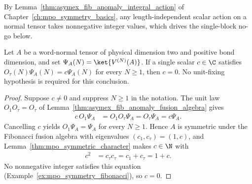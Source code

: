 By Lemma~\ref{thm:asymex_fib_anomaly_integral_action} of
Chapter~\ref{ch:mpo_symmetry_basics}, any length-independent scalar action on a
normal tensor takes nonnegative integer values, which drives the single-block
no-go below.

\begin{lemma}%
    \label{thm:asymex_fib_anomaly_eigenvalue_zero}
    \leanok
    Let $A$ be a word-normal tensor of physical dimension two and
    positive bond dimension, and set
    $\Psi_A(N)=\ket{V^{(N)}(A)}$. If a single scalar $c\in\C$ satisfies
    $O_\tau(N)\Psi_A(N)=c\Psi_A(N)$ for every $N\geq1$, then $c=0$.
    No unit-fixing hypothesis is required for this conclusion.
\end{lemma}

\begin{proof}
    \leanok
    Suppose $c\neq0$ and suppress $N\geq1$ in the notation. The unit law
    $O_1O_\tau=O_\tau$ of
    Lemma~\ref{thm:asymex_fib_anomaly_fusion_algebra} gives
    \begin{align}
        c\,O_1\Psi_A
         & =O_1O_\tau\Psi_A=O_\tau\Psi_A=c\Psi_A.
    \end{align}
    Cancelling $c$ yields $O_1\Psi_A=\Psi_A$ for every $N\geq1$. Hence $A$
    is symmetric under the Fibonacci fusion algebra with eigenvalues
    $(c_1,c_\tau)=(1,c)$, and
    Lemma~\ref{thm:mpo_symmetric_character} makes $c\in\N$ with
    \begin{align}
        c^2 & =c_\tau c_\tau=c_1+c_\tau=1+c.
    \end{align}
    No nonnegative integer satisfies this equation
    (Example~\ref{ex:mpo_symmetry_fibonacci}), so $c=0$.
\end{proof}

